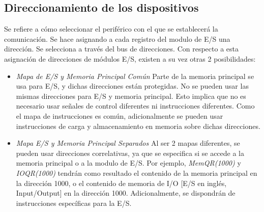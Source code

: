 \documentclass[a4paper,11pt,spanish]{report}
\begin{document}
\subsection{Direccionamiento de los dispositivos}

Se refiere a cómo seleccionar el periférico con el que se establecerá la comunicación. Se hace asignando a cada registro del modulo de E/S una dirección. Se selecciona a través del bus de direcciones. Con respecto a esta asignación de direcciones de módulos E/S, existen a su vez otras 2 posibilidades:
\begin{itemize}
\item \emph{Mapa de E/S y Memoria Principal Común} Parte de la memoria principal se usa para E/S, y dichas direcciones están protegidas. No se pueden usar las mismas direcciones para E/S y memoria principal. Esto implica que no es necesario usar señales de control diferentes ni instrucciones diferentes. Como el mapa de instrucciones es común, adicionalmente se pueden usar instrucciones de carga y almacenamiento en memoria sobre dichas direcciones.
\item \emph{Mapa E/S y Memoria Principal Separados} Al ser 2 mapas diferentes, se pueden usar direcciones correlativas, ya que se especifica si se accede a la memoria principal o a la modulo de E/S. Por ejemplo, \emph{MemQR(1000)} y \emph{IOQR(1000)} tendrán como resultado el contenido de la memoria principal en la dirección 1000, o el contenido de memoria de I/O [E/S en inglés, Input/Output] en la dirección 1000. Adicionalmente, se dispondrán de instrucciones específicas para la E/S.
\end{itemize}
\end{document}
